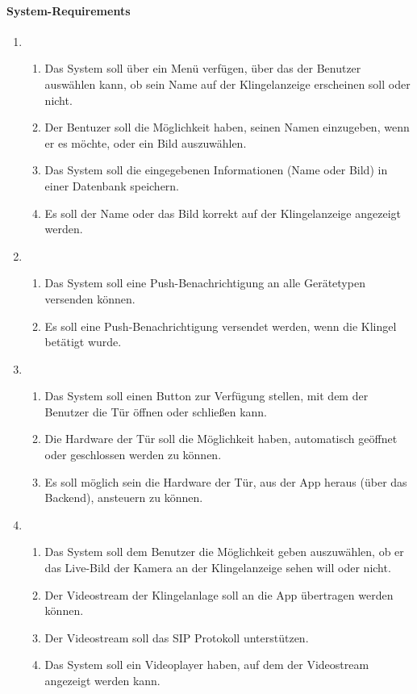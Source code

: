 \paragraph{\large{System-Requirements}}
    \begin{enumerate}
        \item
        \begin{enumerate}[label*=\arabic*.]
            \item Das System soll über ein Menü verfügen, über das der Benutzer auswählen kann, ob sein Name auf der Klingelanzeige erscheinen soll oder nicht.
            \item Der Bentuzer soll die Möglichkeit haben, seinen Namen einzugeben, wenn er es möchte, oder ein Bild auszuwählen.
            \item Das System soll die eingegebenen Informationen (Name oder Bild) in einer Datenbank speichern.
            \item Es soll der Name oder das Bild korrekt auf der Klingelanzeige angezeigt werden.
        \end{enumerate}
        \item
        \begin{enumerate}[label*=\arabic*.]
            \item Das System soll eine Push-Benachrichtigung an alle Gerätetypen versenden können.
            \item Es soll eine Push-Benachrichtigung versendet werden, wenn die Klingel betätigt wurde.
        \end{enumerate}
        \item
        \begin{enumerate}[label*=\arabic*.]
            \item Das System soll einen Button zur Verfügung stellen, mit dem der Benutzer die Tür öffnen oder schließen kann.
            \item Die Hardware der Tür soll die Möglichkeit haben, automatisch geöffnet oder geschlossen werden zu können.
            \item Es soll möglich sein die Hardware der Tür, aus der App heraus (über das Backend), ansteuern zu können.
        \end{enumerate}
        \item
        \begin{enumerate}[label*=\arabic*.]
            \item Das System soll dem Benutzer die Möglichkeit geben auszuwählen, ob er das Live-Bild der Kamera an der Klingelanzeige sehen will oder nicht.
            \item Der Videostream der Klingelanlage soll an die App übertragen werden können.
            \item Der Videostream soll das SIP Protokoll unterstützen.
            \item Das System soll ein Videoplayer haben, auf dem der Videostream angezeigt werden kann.
        \end{enumerate}
    \end{enumerate}